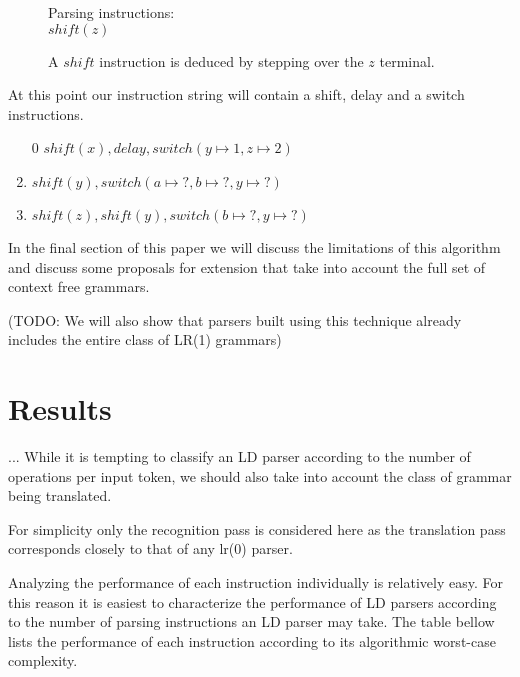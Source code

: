 \documentclass[a4paper,11pt]{article}
\begin{document}
\begin{figure}[!ht]
\begin{center}
\parbox{.3\textwidth}{}
\parbox{.65\textwidth}{Parsing instructions:\\$shift(z)$}
\caption{A $shift$ instruction is deduced by stepping over the $z$ terminal.}
\end{center}
\end{figure}

At this point our instruction string will contain a shift, delay and a switch instructions.
\begin{enumerate}
\item[0] $shift(x), delay, switch(y \mapsto 1, z \mapsto 2)$\\
\item $shift(y), switch(a \mapsto ?, b \mapsto ?, y \mapsto ?)$\\
\item $shift(z), shift(y), switch(b \mapsto ?, y \mapsto ?)$
\end{enumerate}

In the final section of this paper we will discuss the limitations of this algorithm and discuss some proposals for extension that take into account the full set of context free grammars. 

(TODO: We will also show that parsers built using this technique already includes the entire class of LR(1) grammars)

\section*{Results}
...
While it is tempting to classify an LD parser according to the number of operations per input token, we should also take into account the class of grammar being translated.

For simplicity only the recognition pass is considered here as the translation pass corresponds closely to that of any lr(0) parser.

Analyzing the performance of each instruction individually is relatively easy. 
For this reason it is easiest to characterize the performance of LD parsers according to the number of parsing instructions an LD parser may take.
The table bellow lists the performance of each instruction according to its algorithmic worst-case complexity.
\end{document}
